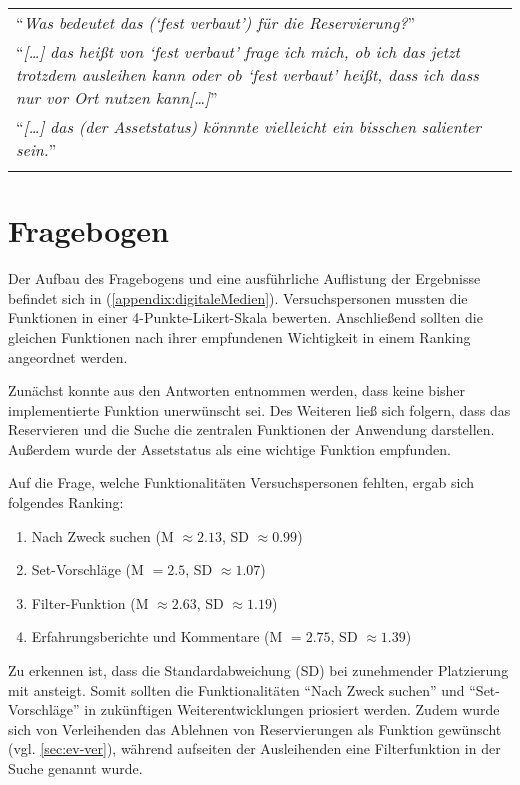\begin{longtable}{p{}} \arrayrulecolor{maincolor}\hline
        \enquote{\textit{Was bedeutet das (\enquote{fest verbaut}) für die Reservierung?}} \\
        \enquote{\textit{[\dots] das heißt von \enquote{fest verbaut} frage ich mich,
                        ob ich das jetzt trotzdem ausleihen kann oder ob \enquote{fest verbaut} heißt,
        dass ich dass nur vor Ort nutzen kann[\dots]}}                                     \\
        \enquote{\textit{[\dots] das (der Assetstatus) könnnte vielleicht ein bisschen
        salienter sein.}}                                                                  \\
        \arrayrulecolor{maincolor}\hline
\end{longtable}



\section{Fragebogen}
Der Aufbau des Fragebogens und eine ausführliche Auflistung der Ergebnisse befindet sich in
(\ref{appendix:digitaleMedien}). Versuchspersonen mussten die Funktionen in einer
4-Punkte-Likert-Skala bewerten. Anschließend sollten die gleichen Funktionen nach ihrer empfundenen
Wichtigkeit in einem Ranking angeordnet werden.

Zunächst konnte aus den Antworten entnommen werden, dass keine bisher implementierte
Funktion unerwünscht sei. Des Weiteren ließ sich folgern, dass das Reservieren und die Suche die
zentralen Funktionen der Anwendung darstellen. Außerdem wurde der Assetstatus als eine wichtige
Funktion empfunden.

Auf die Frage, welche Funktionalitäten Versuchspersonen fehlten, ergab sich folgendes Ranking:
\begin{enumerate}
        \item Nach Zweck suchen (M \(\approx 2.13\), SD \(\approx 0.99\))
        \item Set-Vorschläge (M \( = 2.5\), SD \(\approx 1.07\))
        \item Filter-Funktion (M \( \approx 2.63\), SD \(\approx 1.19\))
        \item Erfahrungsberichte und Kommentare (M \( = 2.75\), SD \(\approx 1.39\))
\end{enumerate}

Zu erkennen ist, dass die Standardabweichung (SD) bei zunehmender Platzierung mit ansteigt. Somit
sollten die Funktionalitäten \enquote{Nach Zweck suchen} und \enquote{Set-Vorschläge}  in
zukünftigen Weiterentwicklungen priosiert werden.  Zudem wurde sich von Verleihenden das Ablehnen von
Reservierungen als Funktion gewünscht (vgl. \ref{sec:ev-ver}), während aufseiten der Ausleihenden
eine Filterfunktion in der Suche genannt wurde.

